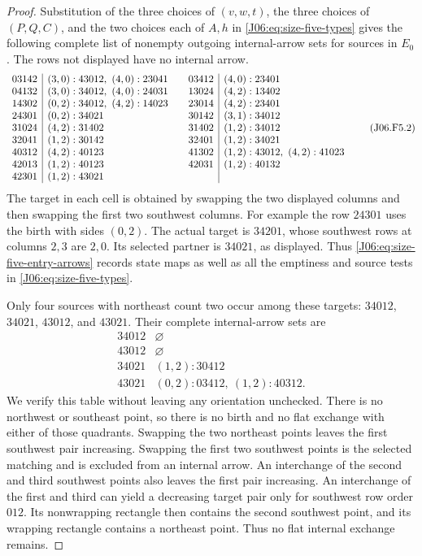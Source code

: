 \documentclass[11pt,oneside]{report}
\theoremstyle{definition}
\numberwithin{equation}{section}
\begin{document}
\begin{proof}
Substitution of the three choices of $(v,w,t)$, the three choices of
$(P,Q,C)$, and the two choices each of $A,h$ in
\eqref{J06:eq:size-five-types} gives the following complete list of
nonempty outgoing internal-arrow sets for sources in $E_0$.
The rows not displayed have no internal arrow.
\[
\begin{array}{c|l@{\qquad}c|l}
03142&(3,0):43012,\ (4,0):23041&03412&(4,0):23401\\
04132&(3,0):34012,\ (4,0):24031&13024&(4,2):13402\\
14302&(0,2):34012,\ (4,2):14023&23014&(4,2):23401\\
24301&(0,2):34021&30142&(3,1):34012\\
31024&(4,2):31402&31402&(1,2):34012\\
32041&(1,2):30142&32401&(1,2):34021\\
40312&(4,2):40123&41302&(1,2):43012,\ (4,2):41023\\
42013&(1,2):40123&42031&(1,2):40132\\
42301&(1,2):43021&&
\end{array}
\tag{J06.F5.2}\label{J06:eq:size-five-entry-arrows}
\]
The target in each cell is obtained by swapping the two displayed
columns and then swapping the first two southwest columns.
For example the row $24301$ uses the birth with sides $(0,2)$.
The actual target is $34201$, whose southwest rows at columns $2,3$
are $2,0$. Its selected partner is $34021$, as displayed.
Thus \eqref{J06:eq:size-five-entry-arrows} records state maps as well as
all the emptiness and source tests in \eqref{J06:eq:size-five-types}.

Only four sources with northeast count two occur among these targets:
$34012$, $34021$, $43012$, and $43021$.
Their complete internal-arrow sets are
\[
\begin{array}{c|l}
34012&\varnothing\\
43012&\varnothing\\
34021&(1,2):30412\\
43021&(0,2):03412,\ (1,2):40312.
\end{array}
\tag{J06.F5.3}\label{J06:eq:size-five-high-arrows}
\]
We verify this table without leaving any orientation unchecked.
There is no northwest or southeast point, so there is no birth and
no flat exchange with either of those quadrants.
Swapping the two northeast points leaves the first southwest pair
increasing. Swapping the first two southwest points is the selected
matching and is excluded from an internal arrow.
An interchange of the second and third southwest points also leaves
the first pair increasing. An interchange of the first and third
can yield a decreasing target pair only for southwest row order
$012$. Its nonwrapping rectangle then contains the second southwest
point, and its wrapping rectangle contains a northeast point.
Thus no flat internal exchange remains.


\end{proof}
\end{document}
